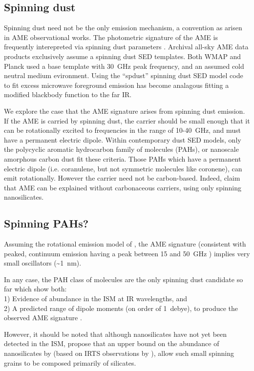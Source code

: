     \subsection{Spinning dust}
     Spinning dust need not be the only emission mechanism, a convention as arisen in AME observational works. The photometric signature of the AME is frequently interepreted via spinning dust parameters \citep{ysard11,ali-haimoud10}. Archival all-sky AME data products exclusively assume a spinning dust SED templates. Both WMAP and Planck used a base template with 30~GHz peak frequency, and an assumed cold neutral medium evironment. Using the ``spdust'' spinning dust SED model code to fit excess microwave foreground emission has become analagous fitting a modified blackbody function to the far IR.

      We explore the case that the AME signature arises from spinning dust emission. If the AME is carried by spinning dust, the carrier should be small enough that it can be rotationally excited to frequencies in the range of 10-40~GHz, and must have a permanent electric dipole. Within contemporary dust SED models, only the polycyclic aromatic hydrocarbon family of molecules (PAHs), or nanoscale amorphous carbon dust fit these criteria. Those PAHs which have a permanent electric dipole (i.e. coranulene, but not symmetric molecules like coronene), can emit rotationally. However the carrier need not be carbon-based. Indeed, \cite{hensley17a} claim that AME can be explained without carbonaceous carriers, using only spinning nanosilicates.

     \subsection{Spinning PAHs?}
       Assuming the rotational emission model of \cite{draine98b}, the AME signature (consistent with peaked, continuum emission having a peak between 15 and 50~GHz ) implies very small oscillators (\textasciitilde{}1~nm).

       In any case, the PAH class of molecules are the only spinning dust candidate so far which show both: \\
       1) Evidence of abundance in the ISM at IR wavelengths, and \\
       2) A predicted range of dipole moments (on order of 1~debye), to produce the observed AME signature \citep{draine98b, lovas05, thorwirth07}.

       However, it should be noted that although nanosilicates have not yet been detected in the ISM, \cite{hensley17a} propose that an upper bound on the abundance of nanosilicates by \cite{li01} (based on IRTS observations by \cite{onaka96}), allow such small spinning grains to be composed primarily of silicates.

